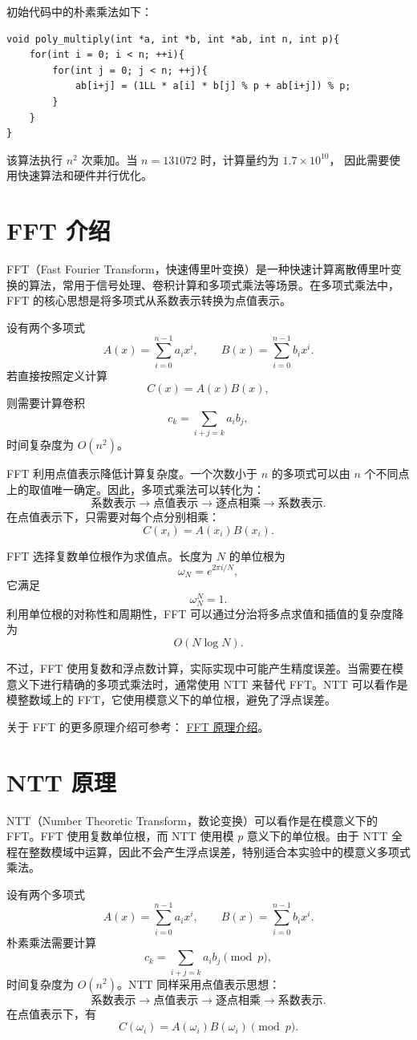 \documentclass[a4paper]{article}
\begin{document}
初始代码中的朴素乘法如下：
\begin{lstlisting}
void poly_multiply(int *a, int *b, int *ab, int n, int p){
    for(int i = 0; i < n; ++i){
        for(int j = 0; j < n; ++j){
            ab[i+j] = (1LL * a[i] * b[j] % p + ab[i+j]) % p;
        }
    }
}
\end{lstlisting}

该算法执行 $n^2$ 次乘加。当 $n=131072$ 时，计算量约为 $1.7\times 10^{10}$，
因此需要使用快速算法和硬件并行优化。
\section{FFT 介绍}

FFT（Fast Fourier Transform，快速傅里叶变换）是一种快速计算离散傅里叶变换的算法，常用于信号处理、卷积计算和多项式乘法等场景。在多项式乘法中，FFT 的核心思想是将多项式从系数表示转换为点值表示。

设有两个多项式
\[
A(x)=\sum_{i=0}^{n-1}a_i x^i,\qquad
B(x)=\sum_{i=0}^{n-1}b_i x^i.
\]
若直接按照定义计算
\[
C(x)=A(x)B(x),
\]
则需要计算卷积
\[
c_k=\sum_{i+j=k}a_i b_j,
\]
时间复杂度为 \(O(n^2)\)。

FFT 利用点值表示降低计算复杂度。一个次数小于 \(n\) 的多项式可以由 \(n\) 个不同点上的取值唯一确定。因此，多项式乘法可以转化为：
\[
\text{系数表示}\rightarrow\text{点值表示}\rightarrow\text{逐点相乘}\rightarrow\text{系数表示}.
\]
在点值表示下，只需要对每个点分别相乘：
\[
C(x_i)=A(x_i)B(x_i).
\]

FFT 选择复数单位根作为求值点。长度为 \(N\) 的单位根为
\[
\omega_N=e^{2\pi i/N},
\]
它满足
\[
\omega_N^N=1.
\]
利用单位根的对称性和周期性，FFT 可以通过分治将多点求值和插值的复杂度降为
\[
O(N\log N).
\]

不过，FFT 使用复数和浮点数计算，实际实现中可能产生精度误差。当需要在模意义下进行精确的多项式乘法时，通常使用 NTT 来替代 FFT。NTT 可以看作是模整数域上的 FFT，它使用模意义下的单位根，避免了浮点误差。

关于 FFT 的更多原理介绍可参考：
\href{https://zhuanlan.zhihu.com/p/76622485}{FFT 原理介绍}。
\section{NTT 原理}

NTT（Number Theoretic Transform，数论变换）可以看作是在模意义下的 FFT。FFT 使用复数单位根，而 NTT 使用模 \(p\) 意义下的单位根。由于 NTT 全程在整数模域中运算，因此不会产生浮点误差，特别适合本实验中的模意义多项式乘法。

设有两个多项式
\[
A(x)=\sum_{i=0}^{n-1}a_i x^i,\qquad
B(x)=\sum_{i=0}^{n-1}b_i x^i.
\]
朴素乘法需要计算
\[
c_k=\sum_{i+j=k}a_i b_j \pmod p,
\]
时间复杂度为 \(O(n^2)\)。NTT 同样采用点值表示思想：
\[
\text{系数表示}\rightarrow\text{点值表示}\rightarrow\text{逐点相乘}\rightarrow\text{系数表示}.
\]
在点值表示下，有
\[
C(\omega_i)=A(\omega_i)B(\omega_i)\pmod p.
\]
\end{document}
